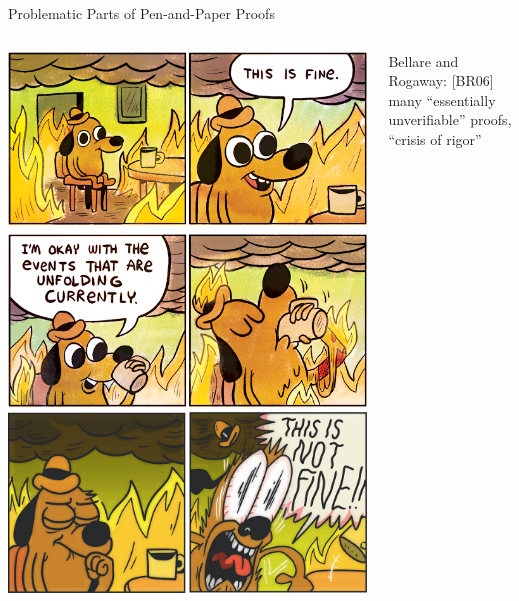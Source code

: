 \begin{frame}{Problematic Parts of Pen-and-Paper Proofs}
\hypertarget{problematic-proofs}{}
  \begin{columns}[fullwidth,c]
    \begin{column}{.3\linewidth}
      \includegraphics[width=\linewidth]{graphics/this-is-fine-crop.png}\\
      \includegraphics[width=\linewidth]{graphics/this-is-not-fine-crop.jpg}%
    \end{column}
    \hspace{1.2em}
    \begin{column}{.68\linewidth}
      \small

      Bellare and Rogaway: [BR06]\\
      \hspace{1.618em} many “essentially unverifiable” proofs, “crisis of rigor”\\[1.5em]


\end{column}
\end{columns}
\end{frame}
